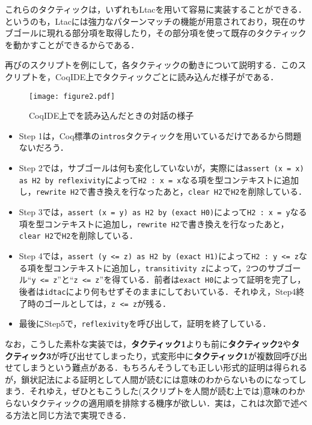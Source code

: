 \documentclass[submit]{ipsj}
\begin{document}
これらのタクティックは，いずれもLtacを用いて容易に実装することができる．というのも，Ltacには強力なパターンマッチの機能が用意されており，現在のサブゴールに現れる部分項を取得したり，その部分項を使って既存のタクティックを動かすことができるからである．

再びのスクリプトを例にして，各タクティックの動きについて説明する．このスクリプトを，CoqIDE上でタクティックごとに読み込んだ様子がである．

\begin{figure}[t]
\texttt{[image: figure2.pdf]}
\caption{CoqIDE上でを読み込んだときの対話の様子}
\label{fig:interective}
\end{figure}

\begin{itemize}
\item Step 1は，Coq標準の\verb+intros+タクティックを用いているだけであるから問題ないだろう．
\item Step 2では，サブゴールは何も変化していないが，実際には\verb+assert (x = x) as H2 by reflexivity+によって\verb+H2 : x = x+なる項を型コンテキストに追加し，\verb+rewrite H2+で書き換えを行なったあと，\verb+clear H2+で\verb+H2+を削除している．
\item Step 3では，\verb+assert (x = y) as H2 by (exact H0)+によって\verb+H2 : x = y+なる項を型コンテキストに追加し，\verb+rewrite H2+で書き換えを行なったあと，\verb+clear H2+で\verb+H2+を削除している．
\item Step 4では，\verb+assert (y <= z) as H2 by (exact H1)+によって\verb+H2 : y <= z+なる項を型コンテキストに追加し，\verb+transitivity z+によって，2つのサブゴール``\verb+y <= z+''と``\verb+z <= z+''を得ている．前者は\verb+exact H0+によって証明を完了し，後者は\verb+idtac+により何もせずそのままにしておいている．それゆえ，Step4終了時のゴールとしては，\verb+z <= z+が残る．
\item 最後にStep5で，\verb+reflexivity+を呼び出して，証明を終了している．
\end{itemize}

なお，こうした素朴な実装では，{\gtfamily\bfseries タクティック1}よりも前に{\gtfamily\bfseries タクティック2}や{\gtfamily\bfseries タクティック3}が呼び出せてしまったり，式変形中に{\gtfamily\bfseries タクティック1}が複数回呼び出せてしまうという難点がある．もちろんそうしても正しい形式的証明は得られるが，鎖状記法による証明として人間が読むには意味のわからないものになってしまう．それゆえ，ぜひともこうした(スクリプトを人間が読む上では)意味のわからないタクティックの適用順を排除する機序が欲しい．実は，これは次節で述べる方法と同じ方法で実現できる．
\end{document}
